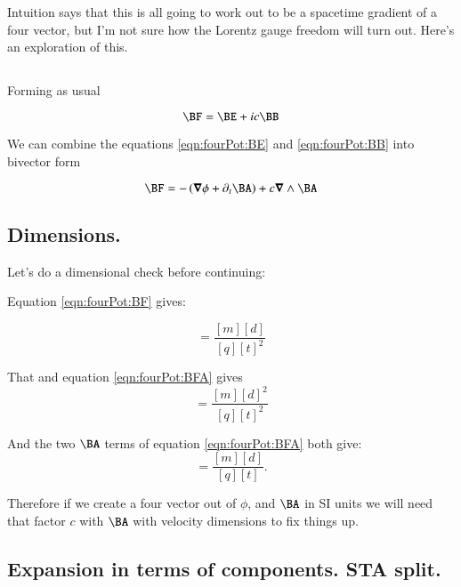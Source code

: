 Intuition says that this is all going to work out to be a spacetime gradient of a four vector, but
I'm not sure how the Lorentz gauge freedom will turn out.  Here's an exploration of this.

\subsection{}

Forming as usual

\begin{equation}\label{eqn:fourPot:BF}
\BF = \BE + i c \BB
\end{equation}

We can combine the equations \ref{eqn:fourPot:BE} and \ref{eqn:fourPot:BB} into bivector form

\begin{equation}\label{eqn:fourPot:BFA}
\BF = - \left( \spacegrad \phi + \partial_t \BA \right) + c \spacegrad \wedge \BA
\end{equation}

\subsection{Dimensions. }

Let's do a dimensional check before continuing:

Equation \ref{eqn:fourPot:BF} gives:

\begin{equation*}
[\BE] = \frac{[m][d]}{[q][t]^2}
\end{equation*}

That and equation \ref{eqn:fourPot:BFA} gives
\begin{equation*}
[\phi] = \frac{[m][d]^2}{[q][t]^2}
\end{equation*}

And the two $\BA$ terms of equation \ref{eqn:fourPot:BFA} both give:
\begin{equation*}
[\BA] = \frac{[m][d]}{[q][t]}.
\end{equation*}

Therefore if we create a four vector out of $\phi$, and $\BA$ in SI units we will need that factor $c$ with $\BA$ with velocity dimensions to fix things up.

\subsection{Expansion in terms of components.  STA split. }

